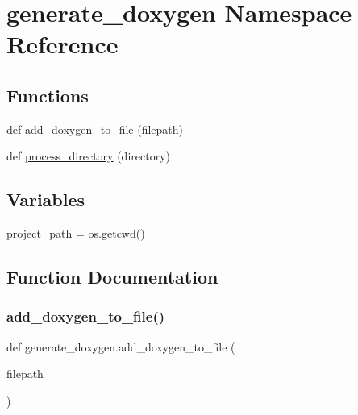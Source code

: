 \hypertarget{namespacegenerate__doxygen}{}\section{generate\+\_\+doxygen Namespace Reference}
\label{namespacegenerate__doxygen}
\subsection*{Functions}
\begin{DoxyCompactItemize}
\item 
def \hyperlink{namespacegenerate__doxygen_a011c4ecb5ff6538406fa43d2f4e294a0}{add\+\_\+doxygen\+\_\+to\+\_\+file} (filepath)
\item 
def \hyperlink{namespacegenerate__doxygen_a53df88af82d48f4c3745bcb5d0973187}{process\+\_\+directory} (directory)
\end{DoxyCompactItemize}
\subsection*{Variables}
\begin{DoxyCompactItemize}
\item 
\hyperlink{namespacegenerate__doxygen_aef24a16e9260486f19bb2aa10574350b}{project\+\_\+path} = os.\+getcwd()
\end{DoxyCompactItemize}


\subsection{Function Documentation}
\mbox{\label{namespacegenerate__doxygen_a011c4ecb5ff6538406fa43d2f4e294a0}} 
\subsubsection{\texorpdfstring{add\+\_\+doxygen\+\_\+to\+\_\+file()}{add\_doxygen\_to\_file()}}
{\footnotesize\ttfamily def generate\+\_\+doxygen.\+add\+\_\+doxygen\+\_\+to\+\_\+file (\begin{DoxyParamCaption}\item[{}]{filepath }\end{DoxyParamCaption})}

